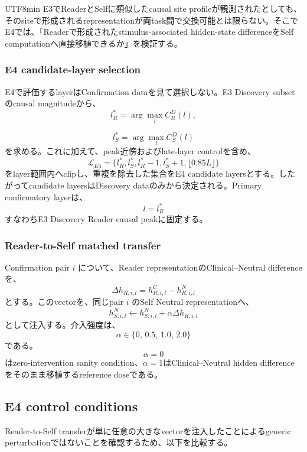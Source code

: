 \documentclass{article} %
\begin{document}
\begin{CJK*}{UTF8}{min}
E3でReaderとSelfに類似したcausal site profileが観測されたとしても、そのsiteで形成されるrepresentationが両task間で交換可能とは限らない。そこでE4では、「Readerで形成されたstimulus-associated hidden-state differenceをSelf computationへ直接移植できるか」を検証する。


\subsubsection{E4 candidate-layer selection}

E4で評価するlayerはConfirmation dataを見て選択しない。E3 Discovery subsetのcausal magnitudeから、
\[
l_R^{*}
=
\arg\max_l C_R^{D}(l),
\]

\[
l_S^{*}
=
\arg\max_l C_S^{D}(l)
\]
を求める。これに加えて、peak近傍およびlate-layer controlを含め、
\[
\mathcal{L}_{E4}
=
\{
l_R^{*},
l_S^{*},
l_R^{*}-1,
l_S^{*}+1,
\lfloor0.85L\rfloor
\}
\]
をlayer範囲内へclipし、重複を除去した集合をE4 candidate layersとする。したがってcandidate layersはDiscovery dataのみから決定される。Primary confirmatory layerは、
\[
l=l_R^{*}
\]
すなわちE3 Discovery Reader causal peakに固定する。


\subsubsection{Reader-to-Self matched transfer}

Confirmation pair \(i\) について、Reader representationのClinical--Neutral differenceを、
\[
\Delta h_{R,i,l}
=
h_{R,i,l}^{C}
-
h_{R,i,l}^{N}
\]
とする。このvectorを、同じpair \(i\) のSelf Neutral representationへ、
\[
h_{S,i,l}^{N}
\leftarrow
h_{S,i,l}^{N}
+
\alpha
\Delta h_{R,i,l}
\]
として注入する。介入強度は、
\[
\alpha
\in
\{
0,\,
0.5,\,
1.0,\,
2.0
\}
\]
である。
\[
\alpha=0
\]
はzero-intervention sanity condition、\(\alpha=1\)はClinical--Neutral hidden differenceをそのまま移植するreference doseである。


\subsection{E4 control conditions}

Reader-to-Self transferが単に任意の大きなvectorを注入したことによるgeneric perturbationではないことを確認するため、以下を比較する。



\end{CJK*}
\end{document}
